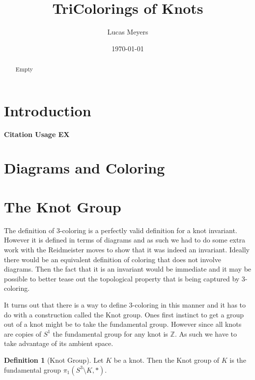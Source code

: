 \documentclass[12pt]{amsart}
\theoremstyle{definition}
\newtheorem{definition}[theorem]{Definition}
\theoremstyle{remark}
\numberwithin{equation}{section}
\newcommand{\bb}[1]{\mathbb{#1}}
\begin{document}
\title{TriColorings of Knots}


\author{Lucas Meyers}
\address{Mathematics Department\\
Louisiana State University\\
Baton Rouge, Louisiana}

\date{\today}

\begin{abstract}
  Empty
\end{abstract}



\maketitle

\section{Introduction}
\label{introduction}

\textbf{Citation Usage EX}~\cite[Problem 2.4.6]{jpsk}

\section{Diagrams and Coloring}
\label{sec:diagrams-coloring}

\section{The Knot Group}
\label{sec:knot-group-d_6}

The definition of 3-coloring is a perfectly valid definition for a knot
invariant. However it is defined in terms of diagrams and as such
we had to do some extra work with the Reidmeister moves to show that it
was indeed an invariant. Ideally there would be an equivalent definition
of coloring that does not involve diagrams. Then the fact that it is
an invariant would be immediate and it may be possible to better tease
out the topological property that is being captured by 3-coloring.

It turns out that there is a way to define 3-coloring in this manner
and it has to do with a construction called the Knot group. Ones first
instinct to get a group out of a knot might be to take the fundamental
group. However since all knots are copies of $S^1$ the fundamental group
for any knot is $\bb{Z}$. As such we have to take advantage of its
ambient space.

\begin{definition}[Knot Group]
  Let $K$ be a knot. Then the Knot group of $K$ is the fundamental
  group $\pi_1(S^3\setminus K,*)$.
\end{definition}
\end{document}

